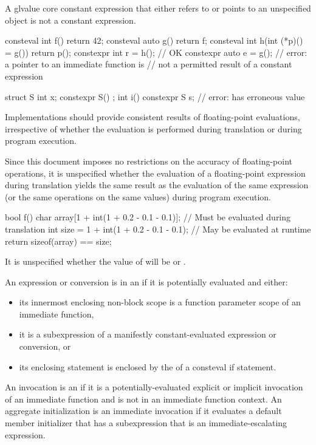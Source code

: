 \begin{note}
A glvalue core constant expression
that either refers to or points to an unspecified object
is not a constant expression.
\end{note}
\begin{example}
\begin{codeblock}
consteval int f() { return 42; }
consteval auto g() { return f; }
consteval int h(int (*p)() = g()) { return p(); }
constexpr int r = h();                          // OK
constexpr auto e = g();                         // error: a pointer to an immediate function is
                                                // not a permitted result of a constant expression

struct S {
  int x;
  constexpr S() {}
};
int i() {
  constexpr S s;                                // error:  has erroneous value
}
\end{codeblock}
\end{example}

\pnum
\recommended
Implementations should provide consistent results of floating-point evaluations,
irrespective of whether the evaluation is performed
during translation or during program execution.
\begin{note}
Since this document
imposes no restrictions on the accuracy of floating-point operations, it is unspecified whether the
evaluation of a floating-point expression during translation yields the same result as the
evaluation of the same expression (or the same operations on the same values) during program
execution.
\begin{example}
\begin{codeblock}
bool f() {
    char array[1 + int(1 + 0.2 - 0.1 - 0.1)];   // Must be evaluated during translation
    int size = 1 + int(1 + 0.2 - 0.1 - 0.1);    // May be evaluated at runtime
    return sizeof(array) == size;
}
\end{codeblock}
It is unspecified whether the value of  will be  or .
\end{example}
\end{note}

\pnum
An expression or conversion is in an 
if it is potentially evaluated and either:
\begin{itemize}
\item
its innermost enclosing non-block scope is
a function parameter scope of an immediate function,
\item
it is a subexpression of a manifestly constant-evaluated expression
or conversion, or
\item
its enclosing statement is enclosed by
the  of a consteval if statement.
\end{itemize}
An invocation is an 
if it is a potentially-evaluated explicit or implicit invocation of
an immediate function and
is not in an immediate function context.
An aggregate initialization is an immediate invocation
if it evaluates a default member initializer
that has a subexpression that is an immediate-escalating expression.

